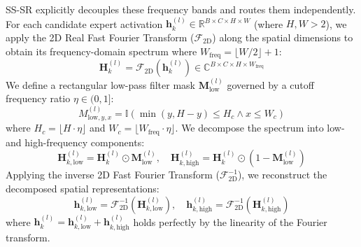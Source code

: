 \documentclass{article}
\theoremstyle{plain}
\theoremstyle{definition}
\theoremstyle{remark}
\begin{document}
    SS-SR explicitly decouples these frequency bands and routes them independently. For each candidate expert activation $\mathbf{h}_k^{(l)} \in \mathbb{R}^{B \times C \times H \times W}$ (where $H, W > 2$), we apply the 2D Real Fast Fourier Transform ($\mathcal{F}_{\text{2D}}$) along the spatial dimensions to obtain its frequency-domain spectrum where $W_{\text{freq}} = \lfloor W/2 \rfloor + 1$:
    \begin{equation}
        \mathbf{H}_k^{(l)} = \mathcal{F}_{\text{2D}}\left( \mathbf{h}_k^{(l)} \right) \in \mathbb{C}^{B \times C \times H \times W_{\text{freq}}}
    \end{equation}
    We define a rectangular low-pass filter mask $\mathbf{M}_{\text{low}}^{(l)}$ governed by a cutoff frequency ratio $\eta \in (0, 1]$:
    \begin{equation}
        M_{\text{low}, y, x}^{(l)} = \mathbb{I}\left( \min(y, H - y) \le H_c \land x \le W_c \right)
    \end{equation}
    where $H_c = \lfloor H \cdot \eta \rfloor$ and $W_c = \lfloor W_{\text{freq}} \cdot \eta \rfloor$. We decompose the spectrum into low- and high-frequency components:
    \begin{equation}
        \mathbf{H}_{k, \text{low}}^{(l)} = \mathbf{H}_k^{(l)} \odot \mathbf{M}_{\text{low}}^{(l)}, \quad \mathbf{H}_{k, \text{high}}^{(l)} = \mathbf{H}_k^{(l)} \odot \left( 1 - \mathbf{M}_{\text{low}}^{(l)} \right)
    \end{equation}
    Applying the inverse 2D Fast Fourier Transform ($\mathcal{F}_{\text{2D}}^{-1}$), we reconstruct the decomposed spatial representations:
    \begin{equation}
        \mathbf{h}_{k, \text{low}}^{(l)} = \mathcal{F}_{\text{2D}}^{-1}\left( \mathbf{H}_{k, \text{low}}^{(l)} \right), \quad \mathbf{h}_{k, \text{high}}^{(l)} = \mathcal{F}_{\text{2D}}^{-1}\left( \mathbf{H}_{k, \text{high}}^{(l)} \right)
    \end{equation}
    where $\mathbf{h}_k^{(l)} = \mathbf{h}_{k, \text{low}}^{(l)} + \mathbf{h}_{k, \text{high}}^{(l)}$ holds perfectly by the linearity of the Fourier transform.
\end{document}
